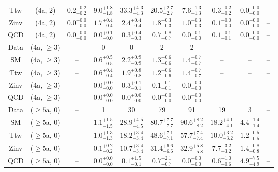 \begin{table}[h!]
{\begin{tabular}{cccccccccc}
	Ttw & (4a, 2) & $0.2^{+ 0.2 }_{- 0.2 }$ & $9.0^{+ 1.8 }_{- 1.8 }$ & $33.3^{+ 4.3 }_{- 4.3 }$ & $20.5^{+ 2.7 }_{- 2.7 }$ & $7.6^{+ 1.3 }_{- 1.3 }$ & $0.3^{+ 0.2 }_{- 0.2 }$ & $0.0^{+ 0.0 }_{- 0.0 }$ & -- \\[0.5ex] 
	Zinv & (4a, 2) & $0.0^{+ 0.0 }_{- 0.0 }$ & $1.7^{+ 0.4 }_{- 0.4 }$ & $2.4^{+ 0.4 }_{- 0.4 }$ & $1.8^{+ 0.3 }_{- 0.3 }$ & $1.0^{+ 0.3 }_{- 0.3 }$ & $0.1^{+ 0.0 }_{- 0.0 }$ & $0.0^{+ 0.0 }_{- 0.0 }$ & -- \\[0.5ex] 
	QCD & (4a, 2) & $0.0^{+ 0.0 }_{- 0.0 }$ & $0.0^{+ 0.1 }_{- 0.0 }$ & $0.3^{+ 0.4 }_{- 0.3 }$ & $0.7^{+ 0.8 }_{- 0.7 }$ & $0.0^{+ 0.1 }_{- 0.0 }$ & $0.1^{+ 0.1 }_{- 0.1 }$ & $0.0^{+ 0.0 }_{- 0.0 }$ & -- \\[0.5ex] 
	Data & (4a, $\ge3$) & -- & 0 & 0 & 2 & 2 & -- & -- & -- \\[0.5ex] 
	SM & (4a, $\ge3$) & -- & $0.6^{+ 0.5 }_{- 0.5 }$ & $2.2^{+ 0.9 }_{- 0.9 }$ & $1.3^{+ 0.6 }_{- 0.6 }$ & $1.4^{+ 0.7 }_{- 0.7 }$ & -- & -- & -- \\[0.5ex] 
	Ttw & (4a, $\ge3$) & -- & $0.6^{+ 0.4 }_{- 0.4 }$ & $1.9^{+ 0.8 }_{- 0.8 }$ & $1.2^{+ 0.6 }_{- 0.6 }$ & $1.4^{+ 0.7 }_{- 0.7 }$ & -- & -- & -- \\[0.5ex] 
	Zinv & (4a, $\ge3$) & -- & $0.0^{+ 0.0 }_{- 0.0 }$ & $0.3^{+ 0.1 }_{- 0.1 }$ & $0.1^{+ 0.1 }_{- 0.1 }$ & $0.0^{+ 0.0 }_{- 0.0 }$ & -- & -- & -- \\[0.5ex] 
	QCD & (4a, $\ge3$) & -- & $0.0^{+ 0.0 }_{- 0.0 }$ & $0.0^{+ 0.0 }_{- 0.0 }$ & $0.0^{+ 0.0 }_{- 0.0 }$ & $0.0^{+ 0.0 }_{- 0.0 }$ & -- & -- & -- \\[0.5ex] 
	Data & ($\ge5$a, 0) & -- & 1 & 30 & 79 & 91 & 19 & 3 & -- \\[0.5ex] 
	SM & ($\ge5$a, 0) & -- & $1.1^{+ 1.5 }_{- 1.5 }$ & $28.9^{+ 4.5 }_{- 4.5 }$ & $80.7^{+ 7.7 }_{- 7.7 }$ & $90.6^{+ 8.2 }_{- 8.2 }$ & $18.2^{+ 4.1 }_{- 4.1 }$ & $4.4^{+ 1.4 }_{- 1.4 }$ & -- \\[0.5ex] 
	Ttw & ($\ge5$a, 0) & -- & $1.0^{+ 1.3 }_{- 1.3 }$ & $18.2^{+ 3.4 }_{- 3.4 }$ & $48.6^{+ 7.1 }_{- 7.1 }$ & $57.7^{+ 7.4 }_{- 7.4 }$ & $10.0^{+ 3.2 }_{- 3.2 }$ & $1.2^{+ 0.5 }_{- 0.5 }$ & -- \\[0.5ex] 
	Zinv & ($\ge5$a, 0) & -- & $0.1^{+ 0.2 }_{- 0.2 }$ & $10.7^{+ 3.4 }_{- 3.4 }$ & $31.4^{+ 6.6 }_{- 6.6 }$ & $32.9^{+ 5.8 }_{- 5.8 }$ & $7.7^{+ 3.2 }_{- 3.2 }$ & $1.4^{+ 0.8 }_{- 0.8 }$ & -- \\[0.5ex] 
	QCD & ($\ge5$a, 0) & -- & $0.0^{+ 0.0 }_{- 0.0 }$ & $0.1^{+ 1.5 }_{- 0.1 }$ & $0.7^{+ 2.1 }_{- 0.7 }$ & $0.0^{+ 0.0 }_{- 0.0 }$ & $0.6^{+ 1.0 }_{- 0.6 }$ & $4.9^{+ 7.5 }_{- 4.9 }$ & -- \\[0.5ex] 

\end{tabular}}
\end{table}
